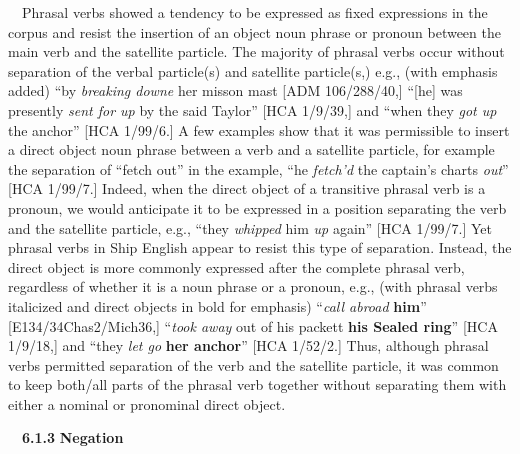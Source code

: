 \begin{styleStandard}
\ \ Phrasal verbs showed a tendency to be expressed as fixed expressions in the corpus and resist the insertion of an object noun phrase or pronoun between the main verb and the satellite particle. The majority of phrasal verbs occur without separation of the verbal particle(s) and satellite particle(s,) e.g., (with emphasis added) “by \textit{breaking downe} her misson mast{\textquotedbl} [ADM 106/288/40,] “[he] was presently \textit{sent for up} by the said Taylor” [HCA 1/9/39,] and “when they \textit{got up} the anchor” [HCA 1/99/6.] A few examples show that it was permissible to insert a direct object noun phrase between a verb and a satellite particle, for example the separation of “fetch out” in the example, “he \textit{fetch’d} the captain’s charts \textit{out}” [HCA 1/99/7.] Indeed, when the direct object of a transitive phrasal verb is a pronoun, we would anticipate it to be expressed in a position separating the verb and the satellite particle, e.g., “they \textit{whipped} him \textit{up} again” [HCA 1/99/7.] Yet phrasal verbs in Ship English appear to resist this type of separation. Instead, the direct object is more commonly expressed after the complete phrasal verb, regardless of whether it is a noun phrase or a pronoun, e.g., (with phrasal verbs italicized and direct objects in bold for emphasis) “\textit{call abroad} \textbf{him}” [E134/34Chas2/Mich36,] “\textit{took away} out of his packett \textbf{his Sealed ring}” [HCA 1/9/18,] and “they \textit{let go} \textbf{her anchor}” [HCA 1/52/2.] Thus, although phrasal verbs permitted separation of the verb and the satellite particle, it was common to keep both/all parts of the phrasal verb together without separating them with either a nominal or pronominal direct object. 
\end{styleStandard}


\begin{styleStandard}
\ \ \textbf{6.1.3} \textbf{Negation}
\end{styleStandard}


